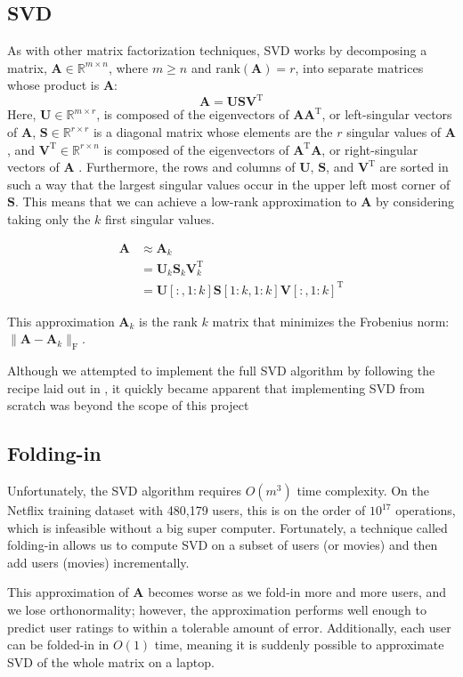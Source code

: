 \documentclass{article} %
\newcommand{\A}{\mathbf{A}}
\newcommand{\T}{\textrm{T}}
\begin{document}
\subsection{SVD}

As with other matrix factorization techniques, SVD works by decomposing a matrix, $\A \in \mathbb{R}^{m \times n}$, where $m \geq n$ and 
$\textrm{rank}(\A) = r$, 
into separate matrices whose product is $\A$:
$$\A = \mathbf{U}\mathbf{S}\mathbf{V}^{\T}$$
Here, $\mathbf{U} \in \mathbb{R}^{m \times r}$, is composed of the eigenvectors of $\A\A^{\T}$, or left-singular vectors of $\A$, 
$\mathbf{S} \in \mathbb{R}^{r \times r}$ is a diagonal matrix whose elements are the $r$ singular values of $\A$,
and $\mathbf{V}^{\T} \in \mathbb{R}^{r \times n}$ is composed of the
eigenvectors of $\A^{\T}\A$, or right-singular vectors of $\A$
\cite{golub1970}.
Furthermore, the rows and columns of $\mathbf{U}$, $\mathbf{S}$, and $\mathbf{V}^{\T}$ are sorted in such a way that the largest singular values occur in the upper left most corner of $\mathbf{S}$.
This means that we can achieve a low-rank approximation to $\A$ by considering taking only the $k$ first singular values.

\begin{align*}
	\A &\approx \A_k\\
	&= \mathbf{U}_k\mathbf{S}_k\mathbf{V}_k^{\T}\\
	&= \mathbf{U}[:,1:k]\mathbf{S}[1:k,1:k]\mathbf{V}[:,1:k]^{\T}
\end{align*}

This approximation $\A_k$ is the rank $k$ matrix that minimizes the Frobenius norm: $\|\A - \A_k\|_{\textrm{F}}$.

Although we attempted to implement the full SVD algorithm by following the recipe laid out in \cite{recipes2007}, it quickly became apparent that implementing SVD from scratch was beyond the scope of this project

\subsection{Folding-in}
Unfortunately, the SVD algorithm requires $O(m^3)$ time complexity.
On the Netflix training dataset with 480,179 users, this is on the order
of $10^{17}$ operations, which is infeasible without a big super computer.
Fortunately, a technique called folding-in allows us to compute SVD on a subset of users (or movies) and then add users (movies) incrementally.


This approximation of $\A$ becomes worse as we fold-in more and more users, and we lose orthonormality; 
however, the approximation performs well enough to predict user ratings to within a tolerable amount of error.
Additionally, each user can be folded-in in $O(1)$ time, meaning it is suddenly possible to approximate SVD of the whole matrix on a laptop.
\end{document}
